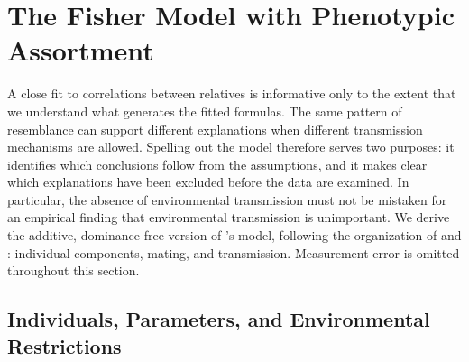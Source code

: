 \section{The Fisher Model with Phenotypic Assortment}
\label{sec:fisher-model}

A close fit to correlations between relatives is informative only to the
extent that we understand what generates the fitted formulas. The same
pattern of resemblance can support different explanations when different
transmission mechanisms are allowed. Spelling out the model therefore
serves two purposes: it identifies which conclusions follow from the
assumptions, and it makes clear which explanations have been excluded
before the data are examined. In particular, the absence of environmental
transmission must not be mistaken for an empirical finding that
environmental transmission is unimportant. We derive the additive,
dominance-free version of \citet{Fisher1918}'s model, following the organization of
\citet{Goldberger1978} and \citet{OttoEtAl1994}: individual components,
mating, and transmission. Measurement error is omitted throughout this
section.

\subsection{Individuals, Parameters, and Environmental Restrictions}
\label{sec:model-components}

